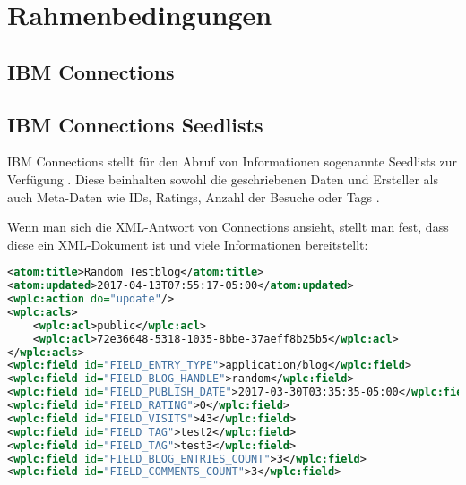

\chapter{Rahmenbedingungen}




\section{IBM Connections}
\large

\newpage


\section{IBM Connections Seedlists}
\large
IBM Connections stellt für den Abruf von Informationen sogenannte Seedlists zur Verfügung \cite{conn2}. Diese beinhalten sowohl die geschriebenen Daten und Ersteller als auch Meta-Daten wie IDs, Ratings, Anzahl der Besuche oder Tags \cite{resp}. 

Wenn man sich die XML-Antwort von Connections ansieht, stellt man fest, dass diese ein XML-Dokument ist und viele Informationen bereitstellt: \\

\noindent
\begin{minipage}{\linewidth}
\begin{lstlisting}[title=Auszug aus einer XML-Antwort von der Connections Blogs-Applikation, language=XML]
<atom:title>Random Testblog</atom:title>
<atom:updated>2017-04-13T07:55:17-05:00</atom:updated>
<wplc:action do="update"/>
<wplc:acls>
	<wplc:acl>public</wplc:acl>
	<wplc:acl>72e36648-5318-1035-8bbe-37aeff8b25b5</wplc:acl>
</wplc:acls>
<wplc:field id="FIELD_ENTRY_TYPE">application/blog</wplc:field>
<wplc:field id="FIELD_BLOG_HANDLE">random</wplc:field>
<wplc:field id="FIELD_PUBLISH_DATE">2017-03-30T03:35:35-05:00</wplc:field>
<wplc:field id="FIELD_RATING">0</wplc:field>
<wplc:field id="FIELD_VISITS">43</wplc:field>
<wplc:field id="FIELD_TAG">test2</wplc:field>
<wplc:field id="FIELD_TAG">test3</wplc:field>
<wplc:field id="FIELD_BLOG_ENTRIES_COUNT">3</wplc:field>
<wplc:field id="FIELD_COMMENTS_COUNT">3</wplc:field>
\end{lstlisting}
\end{minipage}


